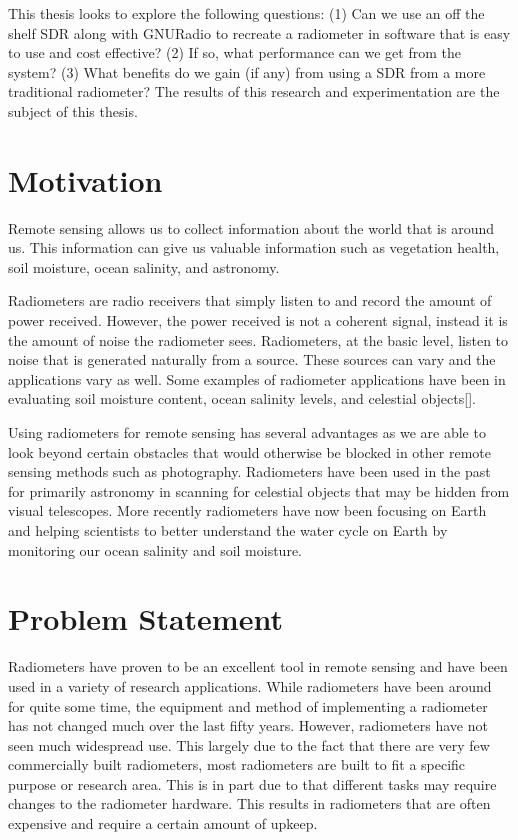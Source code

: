 This thesis looks to explore the following questions: (1) Can we use an off the shelf SDR along with GNURadio to recreate a radiometer in software that is easy to use and cost effective?  (2) If so, what performance can we get from the system?  (3) What benefits do we gain (if any) from using a SDR from a more traditional radiometer? The results of this research and experimentation are the subject of this thesis.

\section{Motivation}
Remote sensing allows us to collect information about the world that is around us.  This information can give us valuable information such as vegetation health, soil moisture, ocean salinity, and astronomy.  

Radiometers are radio receivers that simply listen to and record the amount of power received.  However, the power received is not a coherent signal, instead it is the amount of noise the radiometer sees.  Radiometers, at the basic level, listen to noise that is generated naturally from a source.  These sources can vary and the applications vary as well.  Some examples of radiometer applications have been in evaluating soil moisture content, ocean salinity levels, and celestial objects[\cite{ulaby2014}].

Using radiometers for remote sensing has several advantages as we are able to look beyond certain obstacles that would otherwise be blocked in other remote sensing methods such as photography.  Radiometers have been used in the past for primarily astronomy in scanning for celestial objects that may be hidden from visual telescopes.  More recently radiometers have now been focusing on Earth and helping scientists to better understand the water cycle on Earth by monitoring our ocean salinity and soil moisture.  

\section{Problem Statement}
Radiometers have proven to be an excellent tool in remote sensing and have been used in a variety of research applications.  While radiometers have been around for quite some time, the equipment and method of implementing a radiometer has not changed much over the last fifty years.  However, radiometers have not seen much widespread use.  This largely due to the fact that there are very few commercially built radiometers, most radiometers are built to fit a specific purpose or research area.  This is in part due to that different tasks may require changes to the radiometer hardware.  This results in radiometers that are often expensive and require a certain amount of upkeep.  

